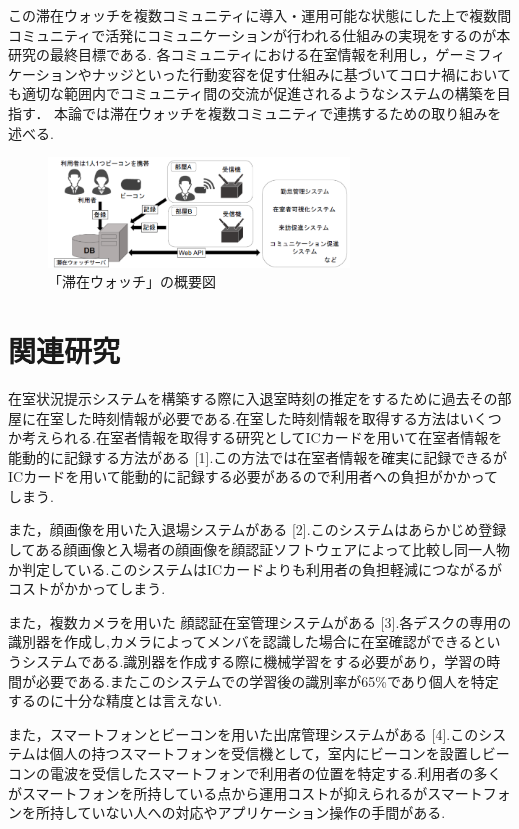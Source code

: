 \documentclass[a4j,8pt,twocolumn]{extarticle}
\begin{document}
この滞在ウォッチを複数コミュニティに導入・運用可能な状態にした上で複数間コミュニティで活発にコミュニケーションが行われる仕組みの実現をするのが本研究の最終目標である.
各コミュニティにおける在室情報を利用し，ゲーミフィケーションやナッジといった行動変容を促す仕組みに基づいてコロナ禍においても適切な範囲内でコミュニティ間の交流が促進されるようなシステムの構築を目指す．
本論では滞在ウォッチを複数コミュニティで連携するための取り組みを述べる.

\begin{figure}[tbh]
    \centering
    \includegraphics[width=8cm]{figure1.jpg}
    \caption{「滞在ウォッチ」の概要図}
    \label{multipleBPM}
\end{figure}

\section{関連研究}
在室状況提示システムを構築する際に入退室時刻の推定をするために過去その部屋に在室した時刻情報が必要である.在室した時刻情報を取得する方法はいくつか考えられる.在室者情報を取得する研究としてICカードを用いて在室者情報を能動的に記録する方法がある [1].この方法では在室者情報を確実に記録できるがICカードを用いて能動的に記録する必要があるので利用者への負担がかかってしまう.

また，顔画像を用いた入退場システムがある [2].このシステムはあらかじめ登録してある顔画像と入場者の顔画像を顔認証ソフトウェアによって比較し同一人物か判定している.このシステムはICカードよりも利用者の負担軽減につながるがコストがかかってしまう.

また，複数カメラを用いた 顔認証在室管理システムがある [3].各デスクの専用の識別器を作成し,カメラによってメンバを認識した場合に在室確認ができるというシステムである.識別器を作成する際に機械学習をする必要があり，学習の時間が必要である.またこのシステムでの学習後の識別率が65\%であり個人を特定するのに十分な精度とは言えない.

また，スマートフォンとビーコンを用いた出席管理システムがある [4].このシステムは個人の持つスマートフォンを受信機として，室内にビーコンを設置しビーコンの電波を受信したスマートフォンで利用者の位置を特定する.利用者の多くがスマートフォンを所持している点から運用コストが抑えられるがスマートフォンを所持していない人への対応やアプリケーション操作の手間がある.
\end{document}
